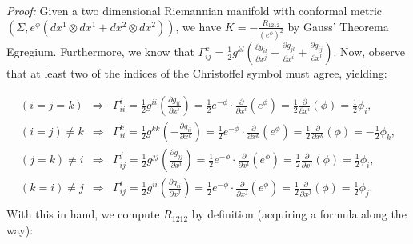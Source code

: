 \documentclass{article}
\newcommand{\tensor}[0]{\otimes}
\newcommand{\christoffel}[3]{\Gamma _{#1 #2} ^{#3}}
\begin{document}
\newline



{\em Proof:} Given a two dimensional Riemannian manifold with conformal metric $(\Sigma, e^\phi (dx ^1 \tensor dx ^1 + dx^2 \tensor dx^2))$, we have $K = - \frac{R_{1212}}{(e^\phi)^2}$ by Gauss' Theorema Egregium. Furthermore, we know that $\christoffel{i}{j}{k}= \frac{1}{2} g^{kl} \left( \frac{\partial g_{il}}{\partial x^j} + \frac{\partial g_{jl}}{\partial x^i} + \frac{\partial g_{ij}}{\partial x^l} \right)$. Now, observe that at least two of the indices of the Christoffel symbol must agree, yielding:

\begin{eqnarray*}
(i=j=k) & \Rightarrow & \christoffel{i}{i}{i} = \frac{1}{2}g^{ii} \left( \frac{\partial g_{ii}}{\partial x^i} \right) = \frac{1}{2} e^{-\phi} \cdot \frac{\partial}{\partial x^i} \left( e^\phi \right) = \frac{1}{2}  \frac{\partial}{\partial x^i} \left(\phi \right) =\frac{1}{2} \phi _i, \\
(i=j)\neq k & \Rightarrow & \christoffel{i}{i}{k} = \frac{1}{2}g^{kk} \left( -\frac{\partial g_{ii}}{\partial x^k} \right) = \frac{1}{2} e^{-\phi} \cdot \frac{\partial}{\partial x^k} \left( e^\phi \right) = \frac{1}{2}  \frac{\partial}{\partial x^k} \left(\phi \right) = - \frac{1}{2} \phi _k, \\
(j=k)\neq i & \Rightarrow & \christoffel{i}{j}{j} = \frac{1}{2}g^{jj} \left( \frac{\partial g_{jj}}{\partial x^i} \right) = \frac{1}{2} e^{-\phi} \cdot \frac{\partial}{\partial x^i} \left( e^\phi \right) = \frac{1}{2}  \frac{\partial}{\partial x^i} \left(\phi \right) =\frac{1}{2} \phi _i, \\
(k=i)\neq j & \Rightarrow & \christoffel{i}{j}{i} = \frac{1}{2}g^{ii} \left( \frac{\partial g_{ii}}{\partial x^j} \right) = \frac{1}{2} e^{-\phi} \cdot \frac{\partial}{\partial x^j} \left( e^\phi \right) = \frac{1}{2}  \frac{\partial}{\partial x^j} \left(\phi \right) =\frac{1}{2} \phi _j. \\
\end{eqnarray*}
With this in hand, we compute $R_{1212}$ by definition (acquiring a formula along the way):
\end{document}
